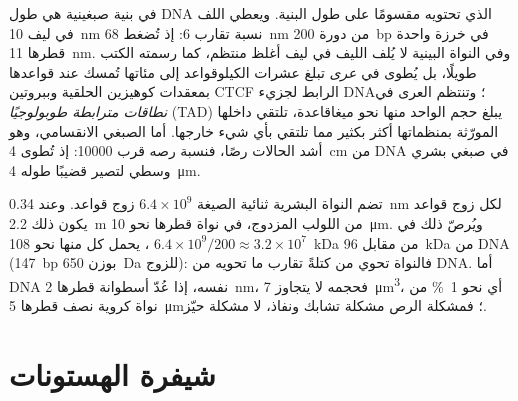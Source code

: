 \begin{proposition}\label{prop:b3:chromatin-epigenetics:compaction}
\emph{} في بنية صبغينية هي طول DNA الذي تحتويه مقسومًا على
طول البنية. ويعطي اللف في ليف \qty{10}{nm} نسبة تقارب $6$: إذ تُضغط
\qty{68}{nm} من دورة \qty{200}{bp} في خرزة واحدة قطرها \qty{11}{nm}.
وفي النواة البينية لا يُلف الليف في ليف أغلظ منتظم، كما رسمته الكتب
طويلًا، بل يُطوى في \emph{عرى} تبلغ عشرات الكيلوقواعد إلى مئاتها
تُمسك عند قواعدها بمعقدات كوهيزين الحلقية وببروتين CTCF الرابط
لجزيء DNA؛ وتنتظم العرى في \emph{نطاقات مترابطة طوبولوجيًا} (TAD) يبلغ
حجم الواحد منها نحو ميغاقاعدة، تلتقي داخلها المورّثة بمنظماتها أكثر
بكثير مما تلتقي بأي شيء خارجها. أما الصبغي الانقسامي، وهو أشد
الحالات رصًا، فنسبة رصه قرب \num{10000}: إذ تُطوى \qty{4}{cm} من DNA
في صبغي بشري وسطي لتصير قضيبًا طوله \qty{4}{\micro m}.
\end{proposition}

\begin{example}\label{ex:b3:chromatin-epigenetics:two-metres}
تضم النواة البشرية ثنائية الصيغة $6.4\times 10^{9}$ زوج قواعد. وعند
\qty{0.34}{nm} لكل زوج قواعد يكون ذلك \qty{2.2}{m} من اللولب المزدوج،
في نواة قطرها نحو \qty{10}{\micro m}. ويُرصّ ذلك في
$6.4\times 10^{9}/200 \approx 3.2\times 10^{7}$ ، يحمل كل
منها نحو \qty{108}{kDa} من  مقابل \qty{96}{kDa} من DNA
(\qty{147}{bp} بوزن \qty{650}{Da} للزوج): فالنواة تحوي من 
كتلةً تقارب ما تحويه من DNA. أما DNA نفسه، إذا عُدّ أسطوانة قطرها
\qty{2}{nm}، فحجمه لا يتجاوز \qty{7}{\micro m^3}، أي نحو
\qty{1}{\%} من نواة كروية نصف قطرها \qty{5}{\micro m}؛ فمشكلة الرص
مشكلة تشابك ونفاذ، لا مشكلة حيّز.
\end{example}

\section{شيفرة الهستونات}

